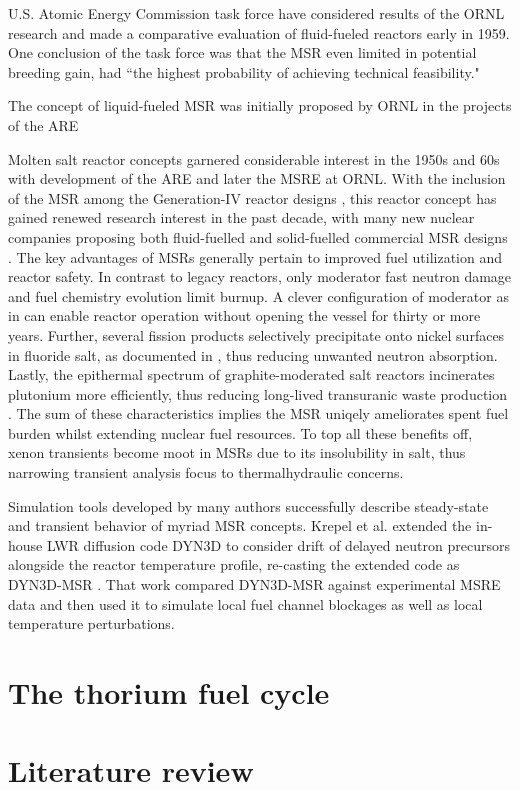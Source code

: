U.S. Atomic Energy Commission task force have considered results of the \gls{ORNL} research and made a comparative evaluation of fluid-fueled reactors early in 1959. One conclusion of the task force was that the \gls{MSR} even limited in potential breeding gain, had ``the highest probability of achieving technical feasibility." \cite{noauthor_report_1959}

The concept of liquid-fueled \gls{MSR} was initially proposed by \gls{ORNL} in the projects of the \gls{ARE} 

Molten salt reactor concepts garnered considerable interest in the 1950s and 60s
with development of the \gls{ARE} and later the \gls{MSRE} at \gls{ORNL}.  With
the inclusion of the \gls{MSR} among the Generation-IV reactor designs
\cite{gif_generation_2008,gif_generation_2015}, this reactor concept has gained renewed research
interest in the past decade, with many new nuclear companies proposing both
fluid-fuelled and solid-fuelled commercial \gls{MSR} designs
\cite{hyde_liquid_2015,leblanc_integral_2015,thorcon_-able_2017,scarlat_design_2014,transatomic_power_corporation_neutronics_2016}.
The key advantages of \gls{MSR}s generally pertain to improved fuel utilization
and reactor safety. In contrast to legacy reactors, only moderator fast neutron
damage and fuel chemistry evolution limit burnup. A clever configuration of moderator
as in \cite{engel_conceptual_1980} can enable reactor operation without opening the vessel
for thirty or more years. Further, several fission products selectively precipitate onto
nickel surfaces in fluoride salt, as documented in \cite{engel_conceptual_1980}, thus reducing
unwanted neutron absorption. Lastly, the epithermal spectrum of graphite-moderated salt reactors
incinerates plutonium more efficiently, thus reducing long-lived transuranic waste production \cite{engel_conceptual_1980}.
The sum of these characteristics implies the \gls{MSR} uniqely ameliorates spent fuel burden whilst
extending nuclear fuel resources. To top all these benefits off, xenon transients become moot in
\gls{MSR}s due to its insolubility in salt, thus narrowing transient analysis focus to thermalhydraulic
concerns.

Simulation tools developed by many authors successfully describe steady-state and
transient behavior of myriad \gls{MSR} concepts. Krepel et al. extended the in-house \gls{LWR}
diffusion code DYN3D to consider drift of delayed neutron precursors alongside
the reactor temperature profile, re-casting the extended code as
DYN3D-MSR \cite{krepel_dyn3d-msr_2007}. That work compared DYN3D-MSR against
experimental \gls{MSRE} data and then used it to simulate local fuel channel
blockages as well as local temperature perturbations.
\section{The thorium fuel cycle}

\section{Literature review}

